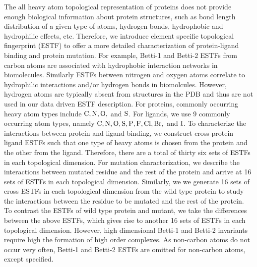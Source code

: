 \documentclass[10pt]{article}
\begin{document}
The all heavy atom topological representation of proteins does not provide enough biological information about protein structures, such as bond length distribution of a given type of atoms, hydrogen bonds, hydrophobic and hydrophilic effects, etc. Therefore, we introduce element specific topological fingerprint (ESTF) to offer a more detailed characterization of protein-ligand binding and protein mutation. For example, Betti-1 and Betti-2 ESTFs from carbon atoms are associated with  hydrophobic interaction networks in biomolecules. Similarly ESTFs between  nitrogen and oxygen atoms correlate to hydrophilic interactions and/or hydrogen bonds in biomolcules. However,  hydrogen atoms are typically absent from structures in the PDB and thus are not used in our data driven ESTF description.  For proteins, commonly occurring heavy atom types include ${\rm C, N, O,}$ and ${\rm S}$. For ligands, we use 9 commonly occurring atom types, namely ${\rm C, N, O, S, P, F, Cl, Br,}$ and  ${\rm I}$. To characterize the interactions between protein and ligand binding, we construct cross protein-ligand ESTFs such that one type of heavy atoms is chosen from the protein and the other from the ligand. Therefore, there are a total of  thirty six sets of  ESTFs in each topological dimension. For mutation characterization, we describe the interactions between mutated residue and the rest of the protein and arrive at 16 sets of ESTFs in each topological dimension. Similarly, we 
we generate  16 sets of cross ESTFs in each topological dimension from the wild type protein to study the interactions between the residue to be mutated and the rest of the protein. To contrast the ESTFs of wild type protein and mutant, we take the differences between the above ESTFs, which gives rise to another 16 sets of ESTFs in each topological dimension. However, high dimensional Betti-1 and Betti-2 invariants require high the formation of high order complexes. As non-carbon atoms do not occur very often,  Betti-1 and Betti-2 ESTFs are omitted for non-carbon atoms, except specified.      
 
\end{document}
